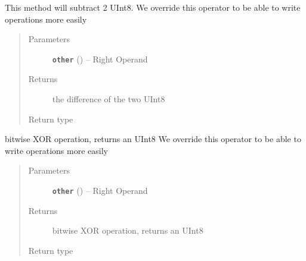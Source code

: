 \documentclass[letterpaper,10pt,english]{sphinxmanual}
\begin{document}
\begin{fulllineitems}
\begin{fulllineitems}
\label{datatypes.integers:datatypes.integers.UInt8.UInt8.__sub__}
This method will subtract 2 UInt8.
We override this operator to be able to write operations more easily
\begin{quote}\begin{description}
\item[{Parameters}] \leavevmode
\textbf{\texttt{other}} ({\hyperref[datatypes.integers:datatypes.integers.UInt8.UInt8]{}}) -- Right Operand

\item[{Returns}] \leavevmode
the difference of the two UInt8

\item[{Return type}] \leavevmode
{\hyperref[datatypes.integers:datatypes.integers.UInt8.UInt8]{}}

\end{description}\end{quote}

\end{fulllineitems}


\begin{fulllineitems}
\label{datatypes.integers:datatypes.integers.UInt8.UInt8.__xor__}
bitwise XOR operation, returns an UInt8
We override this operator to be able to write operations more easily
\begin{quote}\begin{description}
\item[{Parameters}] \leavevmode
\textbf{\texttt{other}} ({\hyperref[datatypes.integers:datatypes.integers.UInt8.UInt8]{}}) -- Right Operand

\item[{Returns}] \leavevmode
bitwise XOR operation, returns an UInt8

\item[{Return type}] \leavevmode
{\hyperref[datatypes.integers:datatypes.integers.UInt8.UInt8]{}}

\end{description}\end{quote}

\end{fulllineitems}


\end{fulllineitems}
\end{document}
